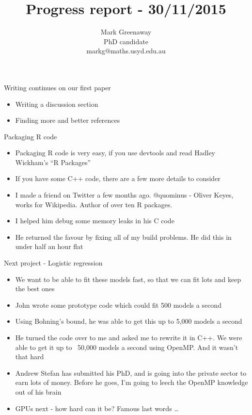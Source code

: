 \documentclass{beamer}
\title{Progress report - 30/11/2015}
\author{Mark Greenaway\\PhD candidate\\markg@maths.usyd.edu.au}
\begin{document}
\begin{frame}
\maketitle
\end{frame}

\begin{frame}{Writing continues on our first paper}
\begin{itemize}
\item Writing a discussion section
\item Finding more and better references
\end{itemize}
\end{frame}

\begin{frame}{Packaging R code}
\begin{itemize}
\item Packaging R code is very easy, if you use devtools and read Hadley Wickham's ``R Packages''
\item If you have some C++ code, there are a few more details to consider
\item I made a friend on Twitter a few months ago. @quominus - Oliver Keyes, works for Wikipedia. Author of
			over ten R packages.
\item I helped him debug some memory leaks in his C code
\item He returned the favour by fixing all of my build problems. He did this in under half an hour flat
\end{itemize}
\end{frame}

\begin{frame}{Next project - Logistic regression}
\begin{itemize}
\item We want to be able to fit these models fast, so that we can fit lots and keep the best ones
\item John wrote some prototype code which could fit 500 models a second
\item Using Bohning's bound, he was able to get this up to 5,000 models a second
\item He turned the code over to me and asked me to rewrite it in C++. We were able to get it up to ~50,000
			models a second using OpenMP. And it wasn't that hard
\item Andrew Stefan has submitted his PhD, and is going into the private sector to earn lots of money. Before
			he goes, I'm going to leech the OpenMP knowledge out of his brain
\item GPUs next - how hard can it be? Famous last words \ldots
\end{itemize}
\end{frame}
\end{document}

